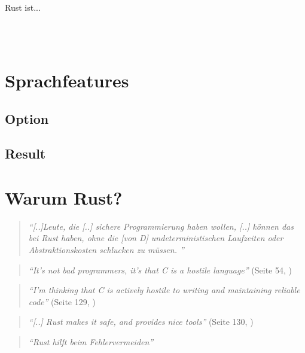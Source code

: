 
Rust ist...

 \\
 \\
\cite{rust:orly_programming}

\FloatBarrier
\section{Sprachfeatures}
\subsection{Option}
\subsection{Result}

\section{Warum Rust?}

\begin{quotation}
	\textit{\enquote{[..]Leute, die [..] sichere Programmierung haben wollen, [..] können das bei Rust haben, ohne die [von D] undeterministischen Laufzeiten oder Abstraktionskosten schlucken zu müssen. }}
	\cite{rust:fefe}
\end{quotation}




\begin{quotation}
	\textit{\enquote{It’s not bad programmers, it’s that C is a hostile language}} 
	(Seite 54, \cite{rust:c_is_hostile_mena})
\end{quotation}

\begin{quotation}
	\textit{\enquote{I’m thinking that C is actively hostile to writing and maintaining reliable code}} 
	(Seite 129, \cite{rust:c_is_hostile_mena})
\end{quotation}

\begin{quotation}
	\textit{\enquote{[..] Rust makes it safe, and  provides nice tools}} 
	(Seite 130, \cite{rust:c_is_hostile_mena})
\end{quotation}


\begin{quotation}
	\textit{\enquote{Rust hilft beim Fehlervermeiden}} 
	\cite{rust:c_is_hostile_golem}
\end{quotation}


